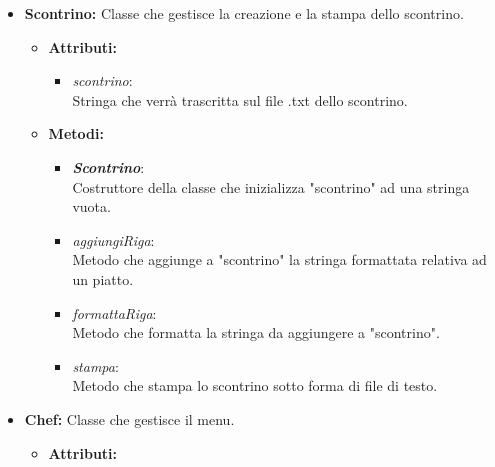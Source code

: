 \documentclass{article}
\begin{document}
\begin{itemize}
\begin{itemize}
\begin{itemize}
            \end{itemize}
        \end{itemize}
        
        \item \textbf{Scontrino:} Classe che gestisce la creazione e la stampa dello scontrino.
        
        \begin{itemize}
            \item \textbf{Attributi:}
            
                \begin{itemize}
                    \item \textit{scontrino}:\\Stringa che verrà trascritta sul file .txt dello scontrino.\\
                \end{itemize}
                
                \item \textbf{Metodi:}
            
            \begin{itemize}
                \item \textbf{\textit{Scontrino}}: \\ Costruttore della classe che inizializza "scontrino" ad una stringa vuota.\\
                \item \textit{aggiungiRiga}: \\Metodo che aggiunge a "scontrino" la stringa formattata relativa ad un piatto.\\
                \item \textit{formattaRiga}: \\ Metodo che formatta la stringa da aggiungere a "scontrino".\\
                \item \textit{stampa}: \\Metodo che stampa lo scontrino sotto forma di file di testo.\\
             
            \end{itemize}
            
        \end{itemize}
        
        \item \textbf{Chef:} Classe che gestisce il menu.
        
        \begin{itemize}
            \item \textbf{Attributi:}
            

\end{itemize}
\end{itemize}
\end{document}
